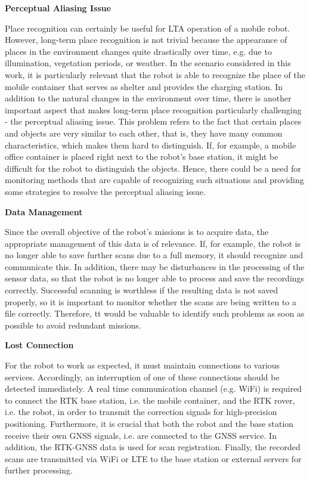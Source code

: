 \documentclass[english, master, utf8]{base/thesis_KBS}
\begin{document}
\noindent
\textbf{Perceptual Aliasing Issue}\newline

\noindent
Place recognition can certainly be useful for LTA operation of a mobile robot. However, long-term place recognition is not trivial because 
the appearance of places in the environment changes quite drastically over time, e.g. due to illumination, vegetation periods, or weather. \cite{Han:2018}
In the scenario considered in this work, it is particularly relevant that the robot is able to recognize the place of the mobile container
that serves as shelter and provides the charging station. In addition to the natural changes in the environment over time, there is another important aspect
that makes long-term place recognition particularly challenging - the perceptual aliasing issue. This problem refers to the fact that certain places and objects are very 
similar to each other, that is, they have many common characteristics, which makes them hard to distinguish. \cite{Han:2018}
If, for example, a mobile office container is placed right next to the robot's base station, it might be difficult for the robot to distinguish the objects.
Hence, there could be a need for monitoring methods that are capable of recognizing such situations and providing some strategies to resolve the perceptual aliasing issue.\newline

\noindent
\textbf{Data Management}\newline

\noindent
Since the overall objective of the robot's missions is to acquire data, the appropriate management of this data is of relevance.
If, for example, the robot is no longer able to save further scans due to a full memory, it should recognize and communicate this.
In addition, there may be disturbances in the processing of the sensor data, so that the robot is no longer able to process and save the recordings correctly.
Successful scanning is worthless if the resulting data is not saved properly, so it is important to monitor whether the scans are being written to a file correctly.
Therefore, tt would be valuable to identify such problems as soon as possible to avoid redundant missions.\newline

\noindent
\textbf{Lost Connection}\newline

\noindent
For the robot to work as expected, it must maintain connections to various services. Accordingly, an interruption of one of these connections should be detected immediately.
A real time communication channel (e.g. WiFi) is required to connect the RTK base station, i.e. the mobile container, and the RTK rover, i.e. the robot, in order to
transmit the correction signals for high-precision positioning. Furthermore, it is crucial that both the robot and the base station receive their own GNSS signals,
i.e. are connected to the GNSS service. In addition, the RTK-GNSS data is used for scan registration. Finally, the recorded scans are transmitted via WiFi or LTE 
to the base station or external servers for further processing.\newline
\end{document}
